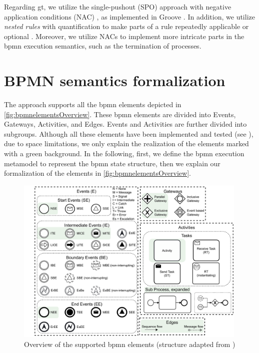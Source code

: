 \documentclass[runningheads]{llncs}
\begin{document}
Regarding \gls*{gt}, we utilize the single-pushout (SPO) approach with negative application conditions (NAC) \cite{ehrigALGEBRAICAPPROACHESGRAPH1997}, as implemented in Groove \cite{rensinkGROOVESimulatorTool2004}.
In addition, we utilize \textit{nested rules} with quantification to make parts of a rule repeatedly applicable or optional \cite{rensinkNestedQuantificationGraph2006,rensinkHowMuchAre2017}.
Moreover, we utilize NACs to implement more intricate parts in the \gls*{bpmn} execution semantics, such as the termination of processes.


\section{BPMN semantics formalization} \label{sec:formalization}

The approach supports all the \gls*{bpmn} elements depicted in \autoref{fig:bpmnelementsOverview}.
These \gls*{bpmn} elements are divided into \textsf{Events}, \textsf{Gateways}, \textsf{Activities}, and \textsf{Edges}.
\textsf{Events} and \textsf{Activities} are further divided into subgroups.
Although all these elements have been implemented and tested (see \cite{krauterArtifactsICGT2023}), due to space limitations, we only explain the realization of the elements marked with a green background.
In the following, first, we define the \gls*{bpmn} execution metamodel to represent the \gls*{bpmn} state structure, then we explain our formalization of the elements in \autoref{fig:bpmnelementsOverview}.


\begin{figure}[ht]
    \centering
    \includegraphics[width=0.99\textwidth]{images/bpmn_semantics-elements-overview.pdf}
    \caption{Overview of the supported \gls*{bpmn} elements (structure adapted from \cite{houhouFirstOrderLogicVerification2022})}
    \label{fig:bpmnelementsOverview}
\end{figure}
\end{document}

